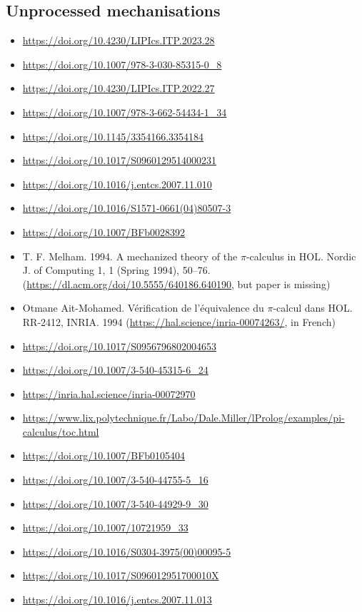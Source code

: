 \subsection{Unprocessed mechanisations}
\begin{itemize}
\item \url{https://doi.org/10.4230/LIPIcs.ITP.2023.28}
\item \url{https://doi.org/10.1007/978-3-030-85315-0_8}
\item \url{https://doi.org/10.4230/LIPIcs.ITP.2022.27}
\item \url{https://doi.org/10.1007/978-3-662-54434-1_34}
\item \url{https://doi.org/10.1145/3354166.3354184}
\item \url{https://doi.org/10.1017/S0960129514000231}
\item \url{https://doi.org/10.1016/j.entcs.2007.11.010}
\item \url{https://doi.org/10.1016/S1571-0661(04)80507-3}
\item \url{https://doi.org/10.1007/BFb0028392}
\item T. F. Melham. 1994. A mechanized theory of the $\pi$-calculus in HOL. Nordic J. of Computing 1, 1 (Spring 1994), 50–76. (\url{https://dl.acm.org/doi/10.5555/640186.640190}, but paper is missing)
\item Otmane Ait-Mohamed. Vérification de l'équivalence du $\pi$-calcul dans HOL. RR-2412, INRIA. 1994 (\url{https://hal.science/inria-00074263/}, in French)
\item \url{https://doi.org/10.1017/S0956796802004653}
\item \url{https://doi.org/10.1007/3-540-45315-6_24}
\item \url{https://inria.hal.science/inria-00072970}
\item \url{https://www.lix.polytechnique.fr/Labo/Dale.Miller/lProlog/examples/pi-calculus/toc.html}
\item \url{https://doi.org/10.1007/BFb0105404}
\item \url{https://doi.org/10.1007/3-540-44755-5_16}
\item \url{https://doi.org/10.1007/3-540-44929-9_30}
\item \url{https://doi.org/10.1007/10721959_33}
\item \url{https://doi.org/10.1016/S0304-3975(00)00095-5}
\item \url{https://doi.org/10.1017/S096012951700010X}
\item \url{https://doi.org/10.1016/j.entcs.2007.11.013}

\end{itemize}
